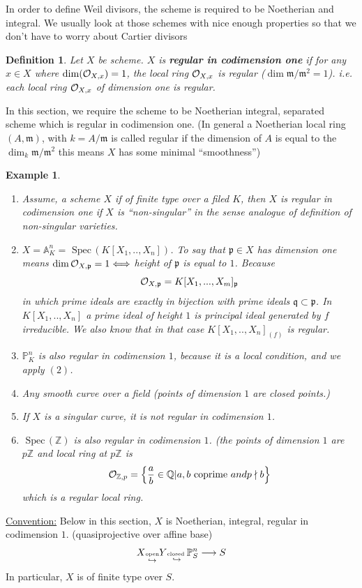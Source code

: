 \documentclass[11pt]{article}
\newtheorem{dfn}[thm]{Definition}
\newtheorem{ex}[thm]{Example}
\newcommand{\spec}{\text{ Spec}\,}
\newcommand{\affn}{\mathbb A}
\newcommand{\proj}{\mathbb P}
\newcommand{\intg}{\mathbb Z}
\newcommand{\ratl}{\mathbb Q}
\newcommand{\scm}{{\mathfrak m}}
\newcommand{\scp}{{\mathfrak p}}
\newcommand{\scq}{\mathfrak q}
\newcommand{\calo}{{\cal O}}
\newcommand{\lrta}{\longrightarrow}
\newcommand{\Llrta}{\Longleftrightarrow}
\newcommand{\inj}{\hookrightarrow}
\begin{document}
In order to define Weil divisors, the scheme is required to be Noetherian and integral. We usually look at those schemes with nice enough properties so that we don't have to worry about Cartier divisors
\begin{dfn}
Let $X$ be scheme. $X$ is \textbf{regular in codimension one} if for any $x\in X$ where $\dim(\calo_{X,x})=1$, the local ring $\calo_{X,x}$ is regular ($\dim \scm/\scm^2=1$). i.e. each local ring $\calo_{X,x}$ of dimension one is regular.
\end{dfn}

In this section, we require the scheme to be Noetherian integral, separated scheme which is regular in codimension one.
(In general a Noetherian local ring $(A,\scm)$, with $k=A/\scm$ is called regular if the dimension of $A$ is equal to the $\dim_k \scm/\scm^2$  this means $X$ has some minimal ``smoothness'')
\begin{ex}
\ \begin{enumerate}[label=(\arabic*)]
\item Assume, a scheme $X$ if of finite type over a filed $K$, then $X$ is regular in codimension one  if $X$ is ``non-singular'' in the sense analogue of definition of non-singular varieties.
\item $X=\affn_K^n=\spec(K[X_1,..,X_n])$. To say that $\scp\in X$ has dimension one means $\dim \calo_{X,\scp}=1\Llrta $ height of $\scp$ is equal to $1$. Because
$$
\calo_{X,\scp}=K[X_1,...,X_m]_{\scp} 
$$
in which prime ideals are exactly in bijection with prime ideals $\scq\subset \scp$. In $K[X_1,..,X_n]$ a prime ideal of height $1$ is principal ideal generated by $f$ irreducible. We also know that in that case $K[X_1,..,X_n]_{(f)}$ is regular.
\item $\proj^n_K$ is also regular in codimension $1$, because it is a local condition, and we apply $(2)$.
\item Any smooth curve over a field (points of dimension $1$ are closed points.)
\item If $X$ is a singular curve, it is not regular in codimension $1$.
\item $\spec(\intg)$ is also regular in codimension $1$. (the points of dimension $1$ are $p\intg$ and local ring  at $p\intg$ is 
$$
\calo_{\intg,p}=\left\{\frac{a}{b}\in \ratl| a,b \text{ coprime } and p\nmid b\right\}
$$
which is a regular local ring.
\end{enumerate}
\end{ex}
\underline{Convention:} Below in this section, $X$ is Noetherian, integral, regular in codimension $1$. (quasiprojective over affine base)
$$
X\underset{\inj}{\text{\tiny open}} Y\underset{\inj}{\text{\tiny closed }} \proj^n_S\lrta S
$$
In particular, $X$ is of finite type over $S$.
\end{document}
